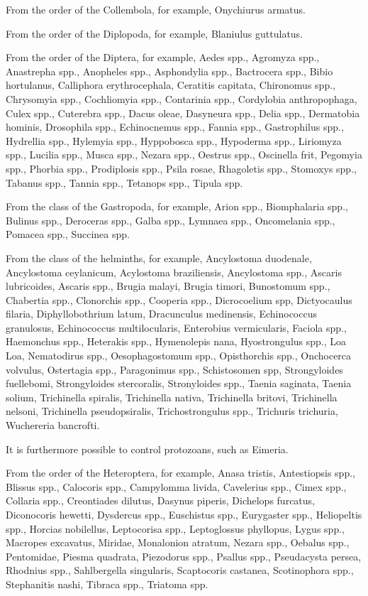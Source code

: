 \documentclass[11pt,a4paper]{article}
\begin{document}
From the order of the Collembola, for example, Onychiurus armatus.

From the order of the Diplopoda, for example, Blaniulus guttulatus.

From the order of the Diptera, for example, Aedes spp., Agromyza spp., Anastrepha spp., Anopheles spp., Asphondylia spp., Bactrocera spp., Bibio hortulanus, Calliphora erythrocephala, Ceratitis capitata, Chironomus spp., Chrysomyia spp., Cochliomyia spp., Contarinia spp., Cordylobia anthropophaga, Culex spp., Cuterebra spp., Dacus oleae, Dasyneura spp., Delia spp., Dermatobia hominis, Drosophila spp., Echinocnemus spp., Fannia spp., Gastrophilus spp., Hydrellia spp., Hylemyia spp., Hyppobosca spp., Hypoderma spp., Liriomyza spp., Lucilia spp., Musca spp., Nezara spp., Oestrus spp., Oscinella frit, Pegomyia spp., Phorbia spp., Prodiplosis spp., Psila rosae, Rhagoletis spp., Stomoxys spp., Tabanus spp., Tannia spp., Tetanops spp., Tipula spp.

From the class of the Gastropoda, for example, Arion spp., Biomphalaria spp., Bulinus spp., Deroceras spp., Galba spp., Lymnaea spp., Oncomelania spp., Pomacea spp., Succinea spp.

From the class of the helminths, for example, Ancylostoma duodenale, Ancylostoma ceylanicum, Acylostoma braziliensis, Ancylostoma spp., Ascaris lubricoides, Ascaris spp., Brugia malayi, Brugia timori, Bunostomum spp., Chabertia spp., Clonorchis spp., Cooperia spp., Dicrocoelium spp, Dictyocaulus filaria, Diphyllobothrium latum, Dracunculus medinensis, Echinococcus granulosus, Echinococcus multilocularis, Enterobius vermicularis, Faciola spp., Haemonchus spp., Heterakis spp., Hymenolepis nana, Hyostrongulus spp., Loa Loa, Nematodirus spp., Oesophagostomum spp., Opisthorchis spp., Onchocerca volvulus, Ostertagia spp., Paragonimus spp., Schistosomen spp, Strongyloides fuellebomi, Strongyloides stercoralis, Stronyloides spp., Taenia saginata, Taenia solium, Trichinella spiralis, Trichinella nativa, Trichinella britovi, Trichinella nelsoni, Trichinella pseudopsiralis, Trichostrongulus spp., Trichuris trichuria, Wuchereria bancrofti.

It is furthermore possible to control protozoans, such as Eimeria.

From the order of the Heteroptera, for example, Anasa tristis, Antestiopsis spp., Blissus spp., Calocoris spp., Campylomma livida, Cavelerius spp., Cimex spp., Collaria spp., Creontiades dilutus, Dasynus piperis, Dichelops furcatus, Diconocoris hewetti, Dysdercus spp., Euschistus spp., Eurygaster spp., Heliopeltis spp., Horcias nobilellus, Leptocorisa spp., Leptoglossus phyllopus, Lygus spp., Macropes excavatus, Miridae, Monalonion atratum, Nezara spp., Oebalus spp., Pentomidae, Piesma quadrata, Piezodorus spp., Psallus spp., Pseudacysta persea, Rhodnius spp., Sahlbergella singularis, Scaptocoris castanea, Scotinophora spp., Stephanitis nashi, Tibraca spp., Triatoma spp.
\end{document}
